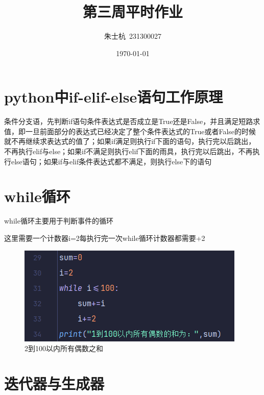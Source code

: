 \documentclass[10pt]{article}
\title{第三周平时作业}
\author{朱士杭\ 231300027}
\date{\kaishu \today}
\begin{document}
	\maketitle
\section{python中if-elif-else语句工作原理}
	条件分支语，先判断if语句条件表达式是否成立是True还是False，并且满足短路求值，即一旦前面部分的表达式已经决定了整个条件表达式的True或者False的时候就不再继续求表达式的值了；如果if满足则执行if下面的语句，执行完以后跳出，不再执行elif与else；如果if不满足则执行elif下面的雨具，执行完以后跳出，不再执行else语句；如果if与elif条件表达式都不满足，则执行else下的语句
\section{while循环}
	while循环主要用于判断事件的循环\par
	这里需要一个计数器i=2每执行完一次while循环计数器都需要+2
	\begin{figure}[H]
		\centering
		\includegraphics[scale=1]{2到100以内所有偶数之和}
		\caption{2到100以内所有偶数之和}
	\end{figure}
\section{迭代器与生成器}
\end{document}
